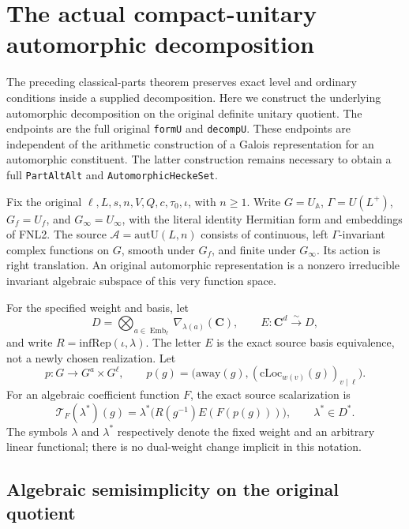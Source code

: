 \documentclass[11pt,a4paper]{article}
\numberwithin{equation}{section}
\theoremstyle{remark}\newtheorem{remark}[theorem]{Remark}
\begin{document}
\section{The actual compact-unitary automorphic decomposition}
\label{sec:automorphic-decomposition-v43}

The preceding classical-parts theorem preserves exact level and ordinary
conditions inside a supplied decomposition.  Here we construct the
underlying automorphic decomposition on the original definite unitary
quotient.  The endpoints are the full original \texttt{form\allowbreak U} and
\texttt{decomp\allowbreak U}.  These endpoints are independent of the arithmetic
construction of a Galois representation for an automorphic constituent.
The latter construction remains necessary to obtain a full
\texttt{Part\allowbreak Alt\allowbreak Alt} and \texttt{Automorphic\allowbreak Hecke\allowbreak Set}.

Fix the original \(\ell,L,s,n,V,Q,c,\tau_0,\iota\), with
\(n\ge1\).  Write \(G=U_{\mathbb A}\),
\(\Gamma=U(L^+)\), \(G_f=U_f\), and \(G_\infty=U_\infty\),
with the literal identity Hermitian form and embeddings of FNL2.  The
source \(\mathcal A=\mathrm{autU}(L,n)\) consists of continuous,
left \(\Gamma\)-invariant complex functions on \(G\), smooth under
\(G_f\), and finite under \(G_\infty\).  Its action is right
translation.  An original automorphic representation is a nonzero
irreducible invariant algebraic subspace of this very function space.

For the specified weight and basis, let
\[
 D=\bigotimes_{a\in\operatorname{Emb}_\ell}
             \nabla_{\lambda(a)}(\mathbf C),\qquad
 E:\mathbf C^d\xrightarrow{\sim}D,
\]
and write \(R=\mathrm{infRep}(\iota,\lambda)\).  The letter \(E\)
is the exact source basis equivalence, not a newly chosen realization.
Let
\[
 p:G\longrightarrow G^a\times G^\ell,
 \qquad
 p(g)=\bigl(\mathrm{away}(g),(\mathrm{cLoc}_{w(v)}(g))_{v\mid\ell}\bigr).
\]
For an algebraic coefficient function \(F\), the exact source scalarization is
\begin{equation}\label{eq:adp-toform}
 \mathcal T_F(\lambda^*)(g)
       =\lambda^*\bigl(R(g^{-1})E(F(p(g)))\bigr),\qquad
                  \lambda^*\in D^*.
\end{equation}
The symbols \(\lambda\) and \(\lambda^*\) respectively denote the fixed
weight and an arbitrary linear functional; there is no dual-weight change
implicit in this notation.

\subsection{Algebraic semisimplicity on the original quotient}
\end{document}

